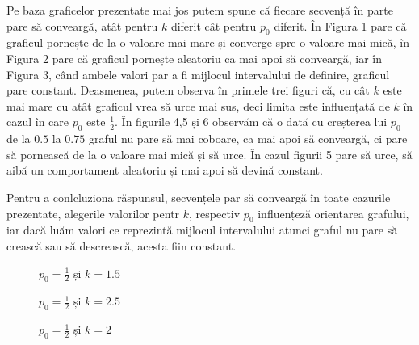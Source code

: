 \documentclass[a4paper,12pt]{article}
\begin{document}
Pe baza graficelor prezentate mai jos putem spune că fiecare secvență în parte pare să conveargă, atât pentru $k$ diferit cât pentru $p_0$ diferit. În Figura 1 pare că graficul pornește de la o valoare mai mare și converge spre o valoare mai mică, în Figura 2 pare că graficul pornește aleatoriu ca mai apoi să conveargă, iar în Figura 3, când ambele valori par a fi mijlocul intervalului de definire, graficul pare constant. Deasmenea, putem observa în primele trei figuri că, cu cât $k$ este mai mare cu atât graficul vrea să urce mai sus, deci limita este influențată de $k$ în cazul în care $p_0$ este $\frac{1}{2}$. În figurile 4,5 și 6 observăm că o dată cu creșterea lui $p_0$ de la $0.5$ la $0.75$ graful nu pare să mai coboare, ca mai apoi să conveargă, ci pare să pornească de la o valoare mai mică și să urce. În cazul figurii 5 pare să urce, să aibă un comportament aleatoriu și mai apoi să devină constant.

Pentru a conlcluziona răspunsul, secvențele par să conveargă în toate cazurile prezentate, alegerile valorilor pentr $k$, respectiv $p_0$ influențeză orientarea grafului, iar dacă luăm valori ce reprezintă mijlocul intervalului atunci graful nu pare să crească sau să descrească, acesta fiin constant.

\begin{figure}
\centering
{}
\caption{$p_0 = \frac{1}{2}$ și $k=1.5$}
\end{figure}


\begin{figure}
\centering
{}
\caption{$p_0 = \frac{1}{2}$ și $k=2.5$}
\end{figure}


\begin{figure}
\centering
{}
\caption{$p_0 = \frac{1}{2}$ și $k=2$}
\end{figure}
\end{document}
